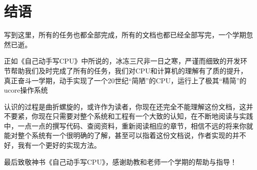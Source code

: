 \chapter{结语}

写到这里，所有的任务也都全部完成，所有的文档也都已经全部写完，一个学期忽然已逝。

正如《自己动手写CPU》中所说的，冰冻三尺非一日之寒，严谨而细致的开发环节帮助我们及时完成了所有的任务，我们对CPU和计算机的理解有了质的提升，真正奋斗一学期，动手实现了一个20世纪“简陋”的CPU，运行上了极其“精简”的ucore操作系统

认识的过程是曲折螺旋的，或许作为读者，你现在还完全不能理解这份文档，这并不要紧，你现在只需要对整个系统和工程有一个大致的认知，在不断地阅读与实践中，一点一点的撰写代码、查阅资料，重新阅读相应的章节，相信不远的将来你就能对整个系统有一个很明确的了解，甚至可以指着这份文档说，作者实现的并不好，我有一个更好的实现方法。

最后致敬神书《自己动手写CPU》，感谢助教和老师一个学期的帮助与指导！